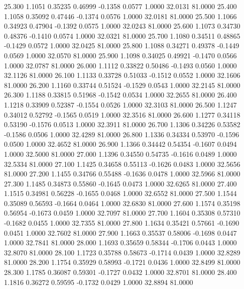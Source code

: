   25.300   1.1051   0.35235   0.46999  -0.1358   0.0577   1.0000  32.0131  81.0000
  25.400   1.1058   0.35092   0.47446  -0.1374   0.0576   1.0000  32.0181  81.0000
  25.500   1.1066   0.34923   0.47904  -0.1392   0.0575   1.0000  32.0243  81.0000
  25.600   1.1073   0.34730   0.48376  -0.1410   0.0574   1.0000  32.0321  81.0000
  25.700   1.1080   0.34511   0.48865  -0.1429   0.0572   1.0000  32.0425  81.0000
  25.800   1.1088   0.34271   0.49378  -0.1449   0.0569   1.0000  32.0570  81.0000
  25.900   1.1098   0.34025   0.49921  -0.1470   0.0566   1.0000  32.0787  81.0000
  26.000   1.1112   0.33822   0.50486  -0.1493   0.0560   1.0000  32.1126  81.0000
  26.100   1.1133   0.33728   0.51033  -0.1512   0.0552   1.0000  32.1606  81.0000
  26.200   1.1160   0.33744   0.51524  -0.1529   0.0543   1.0000  32.2145  81.0000
  26.300   1.1188   0.33815   0.51968  -0.1542   0.0534   1.0000  32.2655  81.0000
  26.400   1.1218   0.33909   0.52387  -0.1554   0.0526   1.0000  32.3103  81.0000
  26.500   1.1247   0.34012   0.52792  -0.1565   0.0519   1.0000  32.3516  81.0000
  26.600   1.1277   0.34118   0.53190  -0.1576   0.0513   1.0000  32.3911  81.0000
  26.700   1.1306   0.34226   0.53582  -0.1586   0.0506   1.0000  32.4289  81.0000
  26.800   1.1336   0.34334   0.53970  -0.1596   0.0500   1.0000  32.4652  81.0000
  26.900   1.1366   0.34442   0.54354  -0.1607   0.0494   1.0000  32.5000  81.0000
  27.000   1.1396   0.34550   0.54735  -0.1616   0.0489   1.0000  32.5334  81.0000
  27.100   1.1425   0.34658   0.55113  -0.1626   0.0483   1.0000  32.5656  81.0000
  27.200   1.1455   0.34766   0.55488  -0.1636   0.0478   1.0000  32.5966  81.0000
  27.300   1.1485   0.34873   0.55860  -0.1645   0.0473   1.0000  32.6265  81.0000
  27.400   1.1515   0.34981   0.56228  -0.1655   0.0468   1.0000  32.6552  81.0000
  27.500   1.1544   0.35089   0.56593  -0.1664   0.0464   1.0000  32.6830  81.0000
  27.600   1.1574   0.35198   0.56954  -0.1673   0.0459   1.0000  32.7097  81.0000
  27.700   1.1604   0.35308   0.57310  -0.1682   0.0455   1.0000  32.7355  81.0000
  27.800   1.1634   0.35421   0.57661  -0.1690   0.0451   1.0000  32.7602  81.0000
  27.900   1.1663   0.35537   0.58006  -0.1698   0.0447   1.0000  32.7841  81.0000
  28.000   1.1693   0.35659   0.58344  -0.1706   0.0443   1.0000  32.8070  81.0000
  28.100   1.1723   0.35788   0.58673  -0.1714   0.0439   1.0000  32.8289  81.0000
  28.200   1.1754   0.35929   0.58993  -0.1721   0.0436   1.0000  32.8499  81.0000
  28.300   1.1785   0.36087   0.59301  -0.1727   0.0432   1.0000  32.8701  81.0000
  28.400   1.1816   0.36272   0.59595  -0.1732   0.0429   1.0000  32.8894  81.0000
